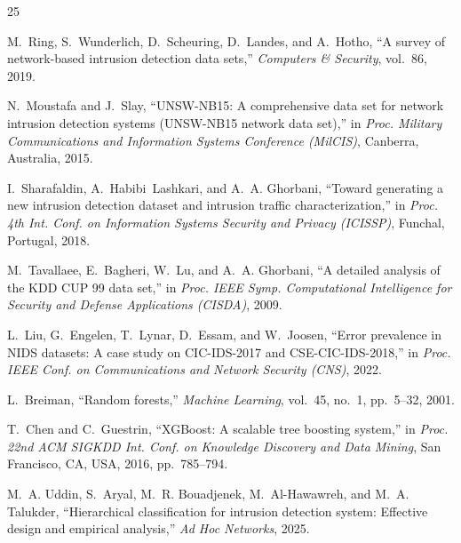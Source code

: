 
\begin{thebibliography}{25}


M.~Ring, S.~Wunderlich, D.~Scheuring, D.~Landes, and A.~Hotho, ``A survey of network-based intrusion detection data sets,'' \textit{Computers \& Security}, vol.~86, 2019.

N.~Moustafa and J.~Slay, ``UNSW-NB15: A comprehensive data set for network intrusion detection systems (UNSW-NB15 network data set),'' in \textit{Proc. Military Communications and Information Systems Conference (MilCIS)}, Canberra, Australia, 2015.

I.~Sharafaldin, A.~Habibi~Lashkari, and A.~A. Ghorbani, ``Toward generating a new intrusion detection dataset and intrusion traffic characterization,'' in \textit{Proc. 4th Int. Conf. on Information Systems Security and Privacy (ICISSP)}, Funchal, Portugal, 2018.

M.~Tavallaee, E.~Bagheri, W.~Lu, and A.~A. Ghorbani, ``A detailed analysis of the KDD CUP 99 data set,'' in \textit{Proc. IEEE Symp. Computational Intelligence for Security and Defense Applications (CISDA)}, 2009.

L.~Liu, G.~Engelen, T.~Lynar, D.~Essam, and W.~Joosen, ``Error prevalence in NIDS datasets: A case study on CIC-IDS-2017 and CSE-CIC-IDS-2018,'' in \textit{Proc. IEEE Conf. on Communications and Network Security (CNS)}, 2022.


L.~Breiman, ``Random forests,'' \textit{Machine Learning}, vol.~45, no.~1, pp.~5--32, 2001.

T.~Chen and C.~Guestrin, ``XGBoost: A scalable tree boosting system,'' in \textit{Proc. 22nd ACM SIGKDD Int. Conf. on Knowledge Discovery and Data Mining}, San Francisco, CA, USA, 2016, pp.~785--794.

M.~A. Uddin, S.~Aryal, M.~R. Bouadjenek, M.~Al-Hawawreh, and M.~A. Talukder, ``Hierarchical classification for intrusion detection system: Effective design and empirical analysis,'' \textit{Ad Hoc Networks}, 2025.


\end{thebibliography}
